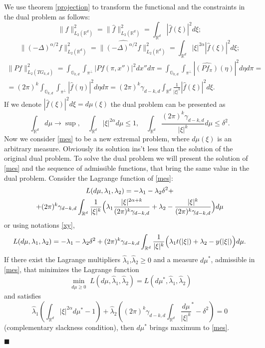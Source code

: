 \documentclass[12pt]{iopart}
\newenvironment{proof}
{\par\noindent{\bf Proof}}
{\hfill$\scriptstyle\blacksquare$}
\begin{document}
\begin{proof}
We use theorem \ref{projection} to transform the functional and the constraints in the dual problem as follows: 
\[
  \|f\|^2_{L_2(\mathbb R^d)}=\|\widehat{f}\|^2_{L_2(\mathbb R^d)}=\int_{\mathbb R^d}|\widehat{f}(\xi )|^2d\xi;
\]
\[ \| (-\Delta)^{\alpha/2}f\|^2_{L_2(\mathbb R^d)}=\|\widehat{(-\Delta)^{\alpha/2}f}\|^2_{L_2(\mathbb R^d)}=\int_{\mathbb R^d}|\xi|^{2\alpha} |\widehat{f}(\xi)|^2d\xi;
\]
\begin{multline*}
  \|Pf\|^2_{L_2(TG_{k,d})}=\int_{\mathbb G_{k,d}}\int_{\pi^\perp}|Pf(\pi,x'')|^2  dx''d\pi =
  \int_{\mathbb G_{k,d}}\int_{\pi^\perp}|\widehat{(Pf_\pi)}(\eta)|^2  d\eta d\pi = \\
  =(2\pi)^{k}\int_{\mathbb G_{k,d}}\int_{\pi^\perp}|\widehat
  f(\eta )|^2d\eta d\pi =
  (2\pi)^{k}\gamma_{d-k,d}\int_{\mathbb R^d}\frac{1}{|\xi|^k}|\widehat f(\xi )|^2d\xi.
\end{multline*}
If we denote $|\widehat f(\xi)|^2 d\xi =d\mu(\xi)$ the dual problem can be presented as
  \begin{equation}
  \label{mes}
  \int_{\mathbb R^d}d\mu\to \sup,\quad
  \int_{\mathbb R^d}|\xi|^{2\alpha}d\mu\leqslant  1,\quad\int_{\mathbb R^d}\frac{(2\pi)^{k}\gamma_{d-k,d}}{|\xi|^k}d\mu\leqslant \delta^2.
  \end{equation}
Now we consider \eqref{mes} to be a new extremal problem, where $d\mu(\xi)$ is an arbitrary measure. Obviously its solution ins't less than the solution of the original dual problem. To solve the dual problem we will present the solution of \eqref{mes} and the sequence of admissible functions, that bring the same value in the dual problem.
Consider the Lagrange function of \eqref{mes}:
 \begin{multline*}
L(d\mu ,\lambda_1,\lambda_2)=-\lambda_1-\lambda_2\delta^2+\\
  +(2\pi)^{k}\gamma_{d-k,d}\int_{\mathbb R^d}\frac{1}{|\xi|^k}\Bigl(\lambda_1\frac{|\xi|^{2\alpha+k}}{(2\pi)^{k}\gamma_{d-k,d}}+\lambda_2-\frac{|\xi|^k}{(2\pi)^{k}\gamma_{d-k,d}}\Bigr)d\mu
\end{multline*}
or using notations \eqref{xy},
 $$
L(d\mu ,\lambda_1,\lambda_2)=-\lambda_1-\lambda_2\delta^2+(2\pi)^{k}\gamma_{d-k,d}\int_{\mathbb R^d}\frac{1}{|\xi|^k}\Bigl(\lambda_1t(|\xi|)+\lambda_2-y(|\xi|)\Bigr)d\mu.
$$
If there exist the Lagrange multipliers $\widehat\lambda_1$,$\widehat\lambda_2\ge 0$ and a measure $d\mu^*$, admissible in \eqref{mes}, that minimizes the Lagrange function
	$$\min_{
\begin{smallmatrix}
d\mu\ge 0
\end{smallmatrix}} L(d\mu,\widehat{\lambda}_1,\widehat{\lambda}_2)=L(d\mu^*,\widehat{\lambda}_1,\widehat{\lambda}_2)$$ and satisfies
$$
\widehat\lambda_1\left(\int_{\mathbb R^d}|\xi|^{2\alpha}d\mu^*-1\right)+\widehat\lambda_2\left((2\pi)^{k}\gamma_{d-k,d}\int_{\mathbb
    R^d}\frac{d\mu}{|\xi|^k}^*-\delta^2 \right)=0
$$
 (complementary slackness condition), then $d\mu^*$ brings maximum to \eqref{mes}. 


\end{proof}
\end{document}
